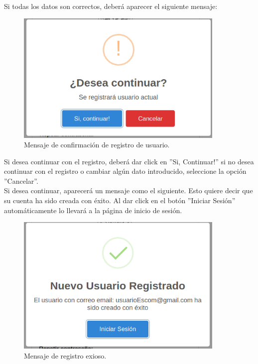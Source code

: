 \documentclass[12pt, a4paper, titlepage]{report}
\begin{document}
        	Si todas los datos son correctos, deberá aparecer el siguiente mensaje: 
        	
        	\begin{figure}[H]
        		\begin{center}	
        		\includegraphics[width=10cm]{./imagenes/Registro/deseaContinuar.png}
        		\caption{Mensaje de confirmación de registro de usuario.}
        		\label{fig:Ext_registo1}
        		\end{center}
        	\end{figure}
        	
        	Si desea continuar con el registro, deberá dar click en ''Si, Continuar!'' si no desea continuar con el registro o cambiar algún dato introducido, seleccione la opción ''Cancelar''.\\
        	Si desea continuar, aparecerá un mensaje como el siguiente. Esto quiere decir que su cuenta ha sido creada con éxito. Al dar click en el botón ''Iniciar Sesión'' automáticamente lo llevará a la página de inicio de sesión.
        	
        	\begin{figure}[H]
        		\begin{center}	
        		\includegraphics[width=10cm]{./imagenes/Registro/Ext_registroExitoso.png}
        		\caption{Mensaje de registro exioso.}
        		\label{fig:Ext_registoExitoso}
        		\end{center}
        	\end{figure}
    	
\end{document}
